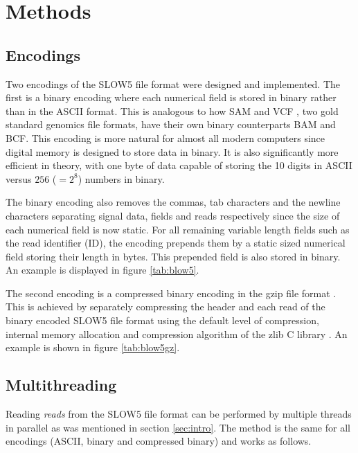 \section{Methods}
\label{sec:methods}

\subsection{Encodings}
\label{sec:methods:encode}

Two encodings of the SLOW5 file format were designed and implemented. The first is a binary encoding where each numerical field is stored in binary rather than in the ASCII format. This is analogous to how SAM \cite{sam:file, sam:stats} and VCF \cite{vcf:file}, two gold standard genomics file formats, have their own binary counterparts BAM and BCF. This encoding is more natural for almost all modern computers since digital memory is designed to store data in binary. It is also significantly more efficient in theory, with one byte of data capable of storing the 10 digits in ASCII versus $256$ ($ = 2^8$) numbers in binary.

The binary encoding also removes the commas, tab characters and the newline characters separating signal data, fields and reads respectively since the size of each numerical field is now static. For all remaining variable length fields such as the read identifier (ID), the encoding prepends them by a static sized numerical field storing their length in bytes. This prepended field is also stored in binary. An example is displayed in figure \ref{tab:blow5}.

The second encoding is a compressed binary encoding in the gzip file format \cite{gzip}. This is achieved by separately compressing the header and each read of the binary encoded SLOW5 file format using the default level of compression, internal memory allocation and compression algorithm of the zlib C library \cite{zlib}. An example is shown in figure \ref{tab:blow5gz}.

\subsection{Multithreading}
\label{sec:methods:multi}

Reading \textit{reads} from the SLOW5 file format can be performed by multiple threads in parallel as was mentioned in section \ref{sec:intro}. The method is the same for all encodings (ASCII, binary and compressed binary) and works as follows.


